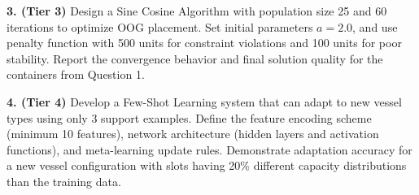 \documentclass{article}
\begin{document}
\textbf{3. (Tier 3)} Design a Sine Cosine Algorithm with population size 25 and 60 iterations to optimize OOG placement. Set initial parameters \(a = 2.0\), and use penalty function with 500 units for constraint violations and 100 units for poor stability. Report the convergence behavior and final solution quality for the containers from Question 1.

\textbf{4. (Tier 4)} Develop a Few-Shot Learning system that can adapt to new vessel types using only 3 support examples. Define the feature encoding scheme (minimum 10 features), network architecture (hidden layers and activation functions), and meta-learning update rules. Demonstrate adaptation accuracy for a new vessel configuration with slots having 20\% different capacity distributions than the training data.
\end{document}

